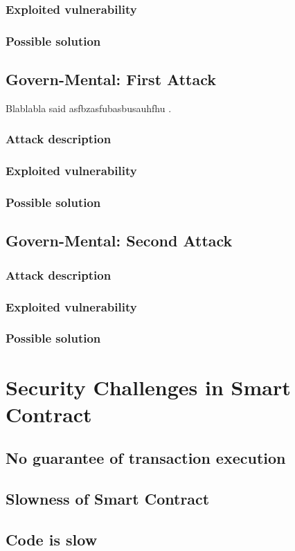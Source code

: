 \subsubsection{Exploited vulnerability}
\subsubsection{Possible solution}

\subsection{Govern-Mental: First Attack}
Blablabla said asfbzasfubasbusauhfhu \cite{WinNT}.
\subsubsection{Attack description}
\subsubsection{Exploited vulnerability}
\subsubsection{Possible solution}

\subsection{Govern-Mental: Second Attack}
\subsubsection{Attack description}
\subsubsection{Exploited vulnerability}
\subsubsection{Possible solution}

\section{Security Challenges in Smart Contract}
\subsection{No guarantee of transaction execution}
\subsection{Slowness of Smart Contract}
\subsection{Code is slow}



{}


